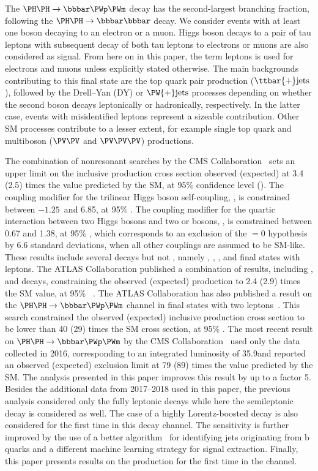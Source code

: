 The $\HH\to\bbWW$ decay has the second-largest branching fraction, following the $\HH\to\bbbb$ decay.
We consider events with at least one \PW boson decaying to an electron or a muon. Higgs boson decays to a pair of tau leptons with subsequent decay of both tau leptons to electrons or muons are also considered as signal. From here on in this paper, the term leptons is used for electrons and muons unless explicitly stated otherwise. The main backgrounds contributing to this final state are the top quark pair production ($\ttbar{+}\text{jets}$), followed by the Drell--Yan (DY) or $\PW{+}\text{jets}$ processes
depending on whether the second \PW boson decays leptonically or hadronically, respectively. In the latter case, events with misidentified leptons represent a sizeable contribution. Other SM processes contribute to a lesser extent, for example single top quark and multiboson ($\PV\PV$ and $\PV\PV\PV$) productions.



The combination of \HH nonresonant searches by the CMS Collaboration~\cite{Nature2022} sets an upper limit on the inclusive \HH production cross section observed (expected) at 3.4 (2.5) times the value predicted by the SM, at 95\% confidence level (\CL). The coupling modifier for the trilinear Higgs boson self-coupling, \klambda, is constrained between $-1.25$~and 6.85, at 95\% \CL. The coupling modifier for the quartic interaction between two Higgs bosons and two \PW or \PZ bosons, \CVV, is constrained between 0.67 and 1.38, at 95\% \CL, which corresponds to an exclusion of the \CVV$=0$ hypothesis by 6.6 standard deviations, when all other couplings are assumed to be SM-like. These results include several \HH decays but not \bbWW, namely \bbgg, \bbbb, \bbtt, \bbZZ and final states with leptons.
The ATLAS Collaboration published a combination of \HH results, including \bbgg, \bbbb and \bbtt decays, constraining the observed (expected) \HH production to 2.4 (2.9) times the SM value, at 95\% \CL~\cite{ATLAS:2022jtk}.
The ATLAS Collaboration has also published a result on the $\HH\to\bbWW$ channel in final states with two leptons~\cite{ATLASbbWW2020}. This search constrained the observed (expected) inclusive \HH production cross section to be lower than 40 (29) times the SM cross section, at 95\% \CL. The most recent result on $\HH\to\bbWW$ by the CMS Collaboration~\cite{HIG-17-006} used only the data collected in 2016, corresponding to an integrated luminosity of 35.9\fbinv and reported an observed (expected) exclusion limit at 79 (89) times the value predicted by the SM. The analysis presented in this paper improves this result by up to a factor 5. Besides the additional data from 2017--2018 used in this paper, the previous analysis considered only the fully leptonic \HWW decays while here the semileptonic decay is considered as well. The case of a highly Lorentz-boosted \Hbb decay is also considered for the first time in this decay channel. The sensitivity is further improved by the use of a better algorithm~\cite{Bols:2020bkb} for identifying jets originating from b quarks and a different machine learning strategy for signal extraction. Finally, this paper presents results on the \VBF production for the first time in the \bbWW channel.

